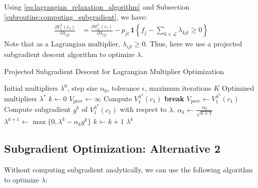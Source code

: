 \documentclass[11pt]{article}
\begin{document}
{\noindent
Using \eqref{eq:lagrangian_relaxation_algorithm} and Subsection \ref{subroutine:computing_subgradient}, we have: 
\begin{align*}
    \frac{\partial V^{\lambda}_{1}(c_{1})}{\partial \lambda_{ijt}} 
    &= \frac{\partial \vartheta^\lambda_{i1}(c_{i})}{\partial \lambda_{ijt}} 
    - p_{jt} \,\mathbf{1}\left\{f_j - \sum_{k \in \mathcal{L}} \lambda_{kjt} \ge 0\right\} 
\end{align*}
Note that as a Lagrangian multiplier, $\lambda_{ijt} \ge 0$. 
Thus, here we use a projected subgradient descent algorithm to optimize $\lambda$.
\begin{algorithm}[H]
\caption{Projected Subgradient Descent for Lagrangian Multiplier Optimization}
\begin{algorithmic}[1]
\Require Initial multipliers $\lambda^0$, step size $\alpha_0$, tolerance $\epsilon$, maximum iterations $K$
\Ensure Optimized multipliers $\lambda^*$
\State $k \gets 0$
\State $V_{\text{prev}} \gets \infty$
    \State Compute $V^{\lambda^k}_{1}(c_{1})$
        \State \textbf{break}
    \EndIf
    \State $V_{\text{prev}} \gets V^{\lambda^k}_{1}(c_{1})$
    \State Compute subgradient $g^k$ of $V^{\lambda^k}_{1}(c_{1})$ with respect to $\lambda$. 
    \State $\alpha_k \gets \frac{\alpha_0}{\sqrt{k+1}}$
    \State $\lambda^{k+1} \gets \max\{0, \lambda^k - \alpha_k g^k\}$ 
    \State $k \gets k + 1$
\EndWhile
\State \Return $\lambda^k$
\end{algorithmic}
\end{algorithm}


}%

\vspace{0.5cm}




\subsection{Subgradient Optimization: Alternative 2}

\noindent
Without computing subgradient analytically, we can use the following algorithm to optimize $\lambda$: 
\end{document}
